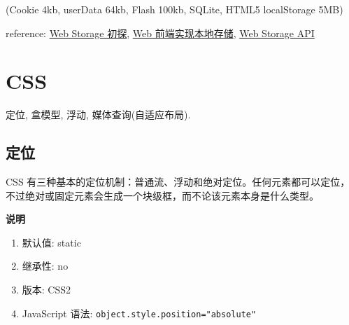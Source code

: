 (Cookie 4kb, userData 64kb, Flash 100kb, SQLite, HTML5 localStorage 5MB)

reference: \href{http://segmentfault.com/a/1190000003936684}{Web Storage
初探}, \href{http://segmentfault.com/a/1190000002701423}{Web
前端实现本地存储},
\href{https://html.spec.whatwg.org/multipage/webstorage.html}{Web
Storage API}

\section{CSS}\label{css}

定位, 盒模型, 浮动, 媒体查询(自适应布局).

\subsection{定位}\label{ux5b9aux4f4d}

CSS
有三种基本的定位机制：普通流、浮动和绝对定位。任何元素都可以定位，不过绝对或固定元素会生成一个块级框，而不论该元素本身是什么类型。

\textbf{说明}

\begin{enumerate}
\def\labelenumi{\arabic{enumi}.}
\tightlist
\item
  默认值: static
\item
  继承性: no
\item
  版本: CSS2
\item
  JavaScript 语法: \lstinline!object.style.position="absolute"!
\end{enumerate}

